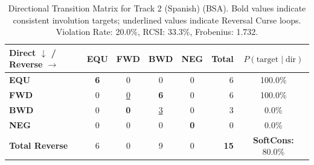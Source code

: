 \begin{table}[ht]
\centering
\small
\begin{tabular}{l|cccc|r|c}
\toprule
\textbf{Direct $\downarrow$ / Reverse $\rightarrow$} & \textbf{EQU} & \textbf{FWD} & \textbf{BWD} & \textbf{NEG} & \textbf{Total} & \textbf{$P(\text{target} \mid \text{dir})$} \\
\midrule
\textbf{EQU} & \textbf{6} & 0 & 0 & 0 & 6 & 100.0\% \\
\textbf{FWD} & 0 & \underline{0} & \textbf{6} & 0 & 6 & 100.0\% \\
\textbf{BWD} & 0 & \textbf{0} & \underline{3} & 0 & 3 & 0.0\% \\
\textbf{NEG} & 0 & 0 & 0 & \textbf{0} & 0 & 0.0\% \\
\midrule
\textbf{Total Reverse} & 6 & 0 & 9 & 0 & \textbf{15} & \textbf{SoftCons:} 80.0\% \\
\bottomrule
\end{tabular}
\caption{Directional Transition Matrix for Track 2 (Spanish) (BSA). Bold values indicate consistent involution targets; underlined values indicate Reversal Curse loops. Violation Rate: 20.0\%, RCSI: 33.3\%, Frobenius: 1.732.}
\label{tab:transition_matrix}
\end{table}